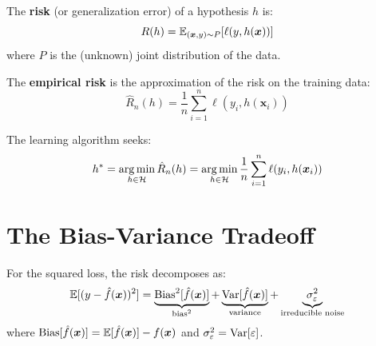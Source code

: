 \begin{definition}[Risk]
The \textbf{risk} (or generalization error) of a hypothesis $h$ is:
\begin{equation}
  R(h) = \mathbb{E}_{(\bm{x}, y) \sim P}[\ell(y, h(\bm{x}))]
\end{equation}
where $P$ is the (unknown) joint distribution of the data.
\end{definition}

\begin{definition}
The \textbf{empirical risk} is the approximation of
the risk on the training data:
\begin{equation}
  \hat{R}_n(h) = \frac{1}{n} \sum_{i=1}^n \ell(y_i, h(\bm{x}_i))
\end{equation}
\end{definition}

\begin{keyformulas}[title=\textbf{Empirical Risk Minimization (ERM)}]
The learning algorithm seeks:
\begin{equation}
  h^* = \operatorname*{arg\,min}_{h \in \mathcal{H}} \hat{R}_n(h) = \operatorname*{arg\,min}_{h \in \mathcal{H}}
  \frac{1}{n} \sum_{i=1}^n \ell(y_i, h(\bm{x}_i))
  \label{eq:erm}
\end{equation}
\end{keyformulas}

\section{The Bias-Variance Tradeoff}
\label{sec:bias-variance}

\begin{theorem}
For the squared loss, the risk decomposes as:
\begin{equation}
  \mathbb{E}[(y - \hat{f}(\bm{x}))^2] = \underbrace{\mathrm{Bias}^2[\hat{f}(\bm{x})]}_{\text{bias}^2}
  + \underbrace{\mathrm{Var}[\hat{f}(\bm{x})]}_{\text{variance}}
  + \underbrace{\sigma^2_\varepsilon}_{\text{irreducible noise}}
\end{equation}
where $\mathrm{Bias}[\hat{f}(\bm{x})] = \mathbb{E}[\hat{f}(\bm{x})] - f(\bm{x})$ and
$\sigma^2_\varepsilon = \mathrm{Var}[\varepsilon]$.
\end{theorem}

\begin{center}
\end{center}

